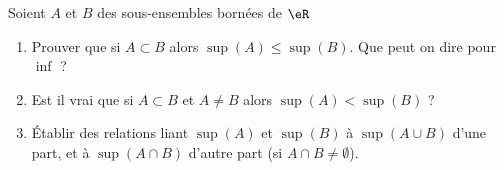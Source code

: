
\begin{exercice}\label{exo0003}


Soient $A$ et $B$ des sous-ensembles bornées de $\eR$
\begin{enumerate}
\item
Prouver que si $A \subset B$ alors $\sup(A) \leq \sup(B)$. Que peut on dire pour $\inf$ ? 
 \item
Est il vrai que si $A \subset B$ et $A \not= B$ alors $\sup(A) < \sup(B)$ ?
\item
Établir des relations liant $\sup(A)$ et $\sup(B)$ à $\sup (A \cup B)$ d'une part, et à $\sup( A \cap B)$ d'autre part (si $A \cap B \not = \emptyset $).

\end{enumerate}

\end{exercice}
